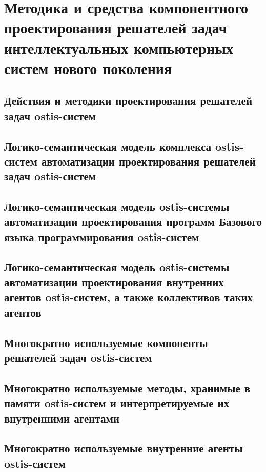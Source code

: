\chapter{Методика и средства компонентного проектирования решателей задач интеллектуальных компьютерных систем нового поколения}
\label{chapter_ps_design}


\section{Действия и методики проектирования решателей задач ostis-систем}
\section{Логико-семантическая модель комплекса ostis-систем автоматизации проектирования решателей задач ostis-систем}
\section{Логико-семантическая модель ostis-системы автоматизации проектирования программ Базового языка программирования ostis-систем}
\section{Логико-семантическая модель ostis-системы автоматизации проектирования внутренних агентов ostis-систем, а также коллективов таких агентов}
\section{Многократно используемые компоненты решателей задач ostis-систем}
\section{Многократно используемые методы, хранимые в памяти ostis-систем и интерпретируемые их внутренними агентами}
\section{Многократно используемые внутренние агенты ostis-систем}

%